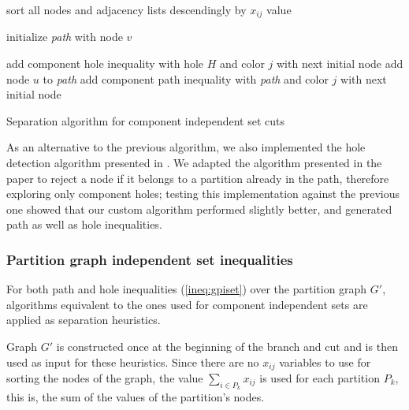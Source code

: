 \begin{algorithm}

\begin{algorithmic}

\STATE sort all nodes and adjacency lists descendingly by $x_{ij}$ value
 
	\STATE initialize \textit{path} with node $v$

	\LOOP
					\STATE add component hole inequality with hole $H$ and color $j$
					\CONTINUE with next initial node
				\ENDIF
			\ELSE
				\STATE add node $u$ to \textit{path}	
					\STATE add component path inequality with \textit{path} and color $j$
					\CONTINUE with next initial node
				\ENDIF
			\ENDIF
		\ENDFOR
	\ENDLOOP
\ENDFOR

\ENDFOR

\caption{Separation algorithm for component independent set cuts}
\label{alg:sep:ciset}

\end{algorithmic}
\end{algorithm}

As an alternative to the previous algorithm, we also implemented the hole detection algorithm presented in \cite{nikolopoulos2004hole}. We adapted the algorithm presented in the paper to reject a node if it belongs to a partition already in the path, therefore exploring only component holes; testing this implementation against the previous one showed that our custom algorithm performed slightly better, and generated path as well as hole inequalities.

\subsubsection{Partition graph independent set inequalities}

For both path and hole inequalities (\ref{ineq:gpiset}) over the partition graph $G'$, algorithms equivalent to the ones used for component independent sets are applied as separation heuristics.

Graph $G'$ is constructed once at the beginning of the branch and cut and is then used as input for these heuristics. Since there are no $x_{ij}$ variables to use for sorting the nodes of the graph, the value $\sum_{i \in P_k} x_{ij}$ is used for each partition $P_k$, this is, the sum of the values of the partition's nodes.

